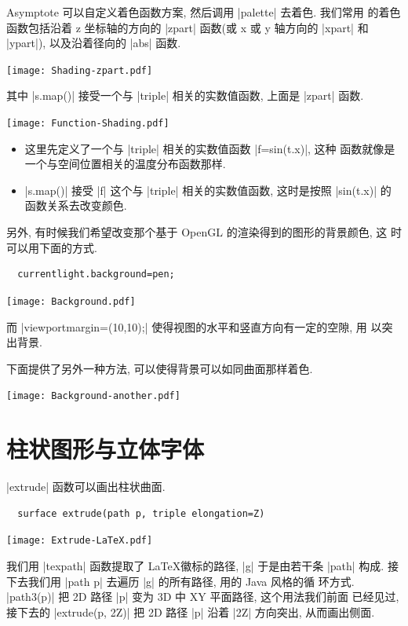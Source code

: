 \documentclass[nofonts,CJKnormalspaces]{ctexbook}[2009/05/20]
\begin{document}
Asymptote 可以自定义着色函数方案, 然后调用 |palette| 去着色. 我们常用
的着色函数包括沿着 z 坐标轴的方向的 |zpart| 函数(或 x 或 y 轴方向的
|xpart| 和 |ypart|), 以及沿着径向的 |abs| 函数.
\begin{center}\texttt{[image: Shading-zpart.pdf]}\end{center}%

其中 |s.map()| 接受一个与 |triple| 相关的实数值函数, 上面是 |zpart| 函数.
\begin{center}\texttt{[image: Function-Shading.pdf]}\end{center}%

\begin{itemize}
\item 这里先定义了一个与 |triple| 相关的实数值函数 |f=sin(t.x)|, 这种
  函数就像是 一个与空间位置相关的温度分布函数那样.
\item  |s.map()| 接受 |f| 这个与 |triple| 相关的实数值函数, 这时是按照
  |sin(t.x)| 的函数关系去改变颜色.
\end{itemize}

另外, 有时候我们希望改变那个基于 OpenGL 的渲染得到的图形的背景颜色, 这
时可以用下面的方式.
\begin{lstlisting}
  currentlight.background=pen;
\end{lstlisting}
\begin{center}\texttt{[image: Background.pdf]}\end{center}%

而 |viewportmargin=(10,10);| 使得视图的水平和竖直方向有一定的空隙, 用
以突出背景.

下面提供了另外一种方法, 可以使得背景可以如同曲面那样着色.
\begin{center}\texttt{[image: Background-another.pdf]}\end{center}%


\section{柱状图形与立体字体}
|extrude| 函数可以画出柱状曲面.
\begin{lstlisting}
  surface extrude(path p, triple elongation=Z)
\end{lstlisting}\label{extrude}
\begin{center}\texttt{[image: Extrude-LaTeX.pdf]}\end{center}%

我们用 |texpath| 函数提取了 \LaTeX 徽标的路径, |g| 于是由若干条 |path|
构成. 接下去我们用 |path p| 去遍历 |g| 的所有路径, 用的 Java 风格的循
环方式. |path3(p)| 把 2D 路径 |p| 变为 3D 中 XY 平面路径, 这个用法我们前面
已经见过, 接下去的 |extrude(p, 2Z)| 把 2D 路径 |p| 沿着 |2Z| 方向突出,
从而画出侧面.
\end{document}
